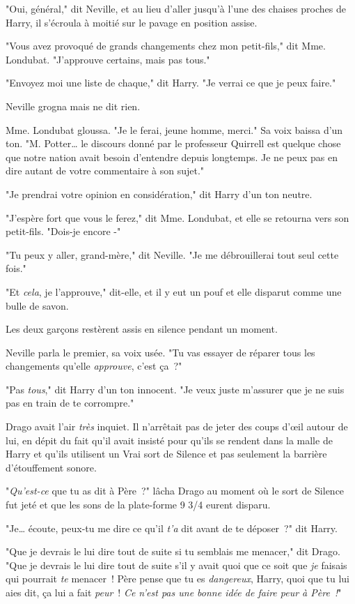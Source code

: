 "Oui, général," dit Neville, et au lieu d'aller jusqu'à l'une des chaises proches de Harry, il s'écroula à moitié sur le pavage en position assise.

"Vous avez provoqué de grands changements chez mon petit-fils," dit Mme. Londubat. "J'approuve certains, mais pas tous."

"Envoyez moi une liste de chaque," dit Harry. "Je verrai ce que je peux faire."

Neville grogna mais ne dit rien.

Mme. Londubat gloussa. "Je le ferai, jeune homme, merci." Sa voix baissa d'un ton. "M. Potter… le discours donné par le professeur Quirrell est quelque chose que notre nation avait besoin d'entendre depuis longtemps. Je ne peux pas en dire autant de votre commentaire à son sujet."

"Je prendrai votre opinion en considération," dit Harry d'un ton neutre.

"J'espère fort que vous le ferez," dit Mme. Londubat, et elle se retourna vers son petit-fils. "Dois-je encore -"

"Tu peux y aller, grand-mère," dit Neville. "Je me débrouillerai tout seul cette fois."

"Et \emph{cela}, je l'approuve," dit-elle, et il y eut un pouf et elle disparut comme une bulle de savon.

Les deux garçons restèrent assis en silence pendant un moment.

Neville parla le premier, sa voix usée. "Tu vas essayer de réparer tous les changements qu'elle \emph{approuve}, c'est ça~?"

"Pas \emph{tous}," dit Harry d'un ton innocent. "Je veux juste m'assurer que je ne suis pas en train de te corrompre."

\later

Drago avait l'air \emph{très} inquiet. Il n'arrêtait pas de jeter des coups d'œil autour de lui, en dépit du fait qu'il avait insisté pour qu'ils se rendent dans la malle de Harry et qu'ils utilisent un Vrai sort de Silence et pas seulement la barrière d'étouffement sonore.

"\emph{Qu'est-ce} que tu as dit à Père~?" lâcha Drago au moment où le sort de Silence fut jeté et que les sons de la plate-forme 9 3/4 eurent disparu.

"Je… écoute, peux-tu me dire ce qu'il \emph{t'a} dit avant de te déposer~?" dit Harry.

"Que je devrais le lui dire tout de suite si tu semblais me menacer," dit Drago. "Que je devrais le lui dire tout de suite s'il y avait quoi que ce soit que \emph{je} faisais qui pourrait \emph{te} menacer~! Père pense que tu es \emph{dangereux}, Harry, quoi que tu lui aies dit, ça lui a fait \emph{peur}~! \emph{Ce n'est pas une bonne idée de faire peur à Père~!}"

